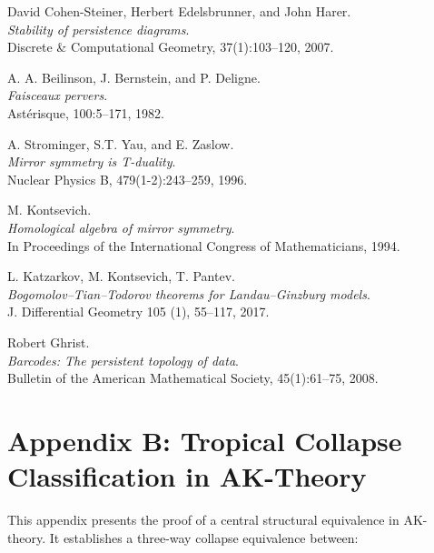 \documentclass[11pt]{article}
\begin{document}
\begin{thebibliography}{9}

David Cohen-Steiner, Herbert Edelsbrunner, and John Harer.\\
\textit{Stability of persistence diagrams}.\\
Discrete \& Computational Geometry, 37(1):103--120, 2007.

A. A. Beilinson, J. Bernstein, and P. Deligne.\\
\textit{Faisceaux pervers}.\\
Ast\'erisque, 100:5–171, 1982.

A. Strominger, S.T. Yau, and E. Zaslow.\\
\textit{Mirror symmetry is T-duality}.\\
Nuclear Physics B, 479(1-2):243–259, 1996.

M. Kontsevich.\\
\textit{Homological algebra of mirror symmetry}.\\
In Proceedings of the International Congress of Mathematicians, 1994.

L. Katzarkov, M. Kontsevich, T. Pantev.\\
\textit{Bogomolov–Tian–Todorov theorems for Landau–Ginzburg models}.\\
J. Differential Geometry 105 (1), 55–117, 2017.

Robert Ghrist.\\
\textit{Barcodes: The persistent topology of data}.\\
Bulletin of the American Mathematical Society, 45(1):61--75, 2008.

\end{thebibliography}





\section*{Appendix B: Tropical Collapse Classification in AK-Theory}

This appendix presents the proof of a central structural equivalence in AK-theory.  
It establishes a three-way collapse equivalence between:
\end{document}
